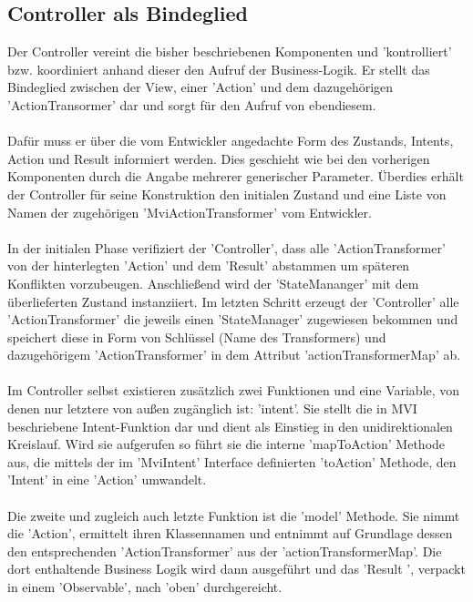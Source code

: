 \subsection{Controller als Bindeglied}
Der Controller vereint die bisher beschriebenen Komponenten und 'kontrolliert' bzw. koordiniert anhand dieser den Aufruf der Business-Logik. Er stellt das Bindeglied zwischen der View, einer 'Action' und dem dazugehörigen 'ActionTransormer' dar und sorgt für den Aufruf von ebendiesem. 
\\\\
Dafür muss er über die vom Entwickler angedachte Form des Zustands, Intents, Action und Result informiert werden. Dies geschieht wie bei den vorherigen Komponenten durch die Angabe mehrerer generischer Parameter. Überdies erhält der Controller für seine Konstruktion den initialen Zustand und eine Liste von Namen der zugehörigen 'MviActionTransformer' vom Entwickler.
\\\\
In der initialen Phase verifiziert der 'Controller', dass alle 'ActionTransformer' von der hinterlegten 'Action' und dem 'Result' abstammen um späteren Konflikten vorzubeugen. Anschließend wird der 'StateMananger' mit dem überlieferten Zustand instanziiert. Im letzten Schritt erzeugt der 'Controller' alle 'ActionTransformer' die jeweils einen 'StateManager' zugewiesen bekommen und speichert diese in Form von Schlüssel (Name des Transformers) und dazugehörigem 'ActionTransformer' in dem Attribut 'actionTransformerMap' ab.
\\\\
Im Controller selbst existieren zusätzlich zwei Funktionen und eine Variable, von denen nur letztere von außen zugänglich ist: 'intent'. Sie stellt die in MVI beschriebene Intent-Funktion dar und dient als Einstieg in den unidirektionalen Kreislauf. Wird sie aufgerufen so führt sie die interne 'mapToAction' Methode aus, die mittels der im 'MviIntent' Interface definierten 'toAction' Methode, den 'Intent' in eine 'Action' umwandelt.
\\\\
Die zweite und zugleich auch letzte Funktion ist die 'model' Methode. Sie nimmt die 'Action', ermittelt ihren Klassennamen und entnimmt auf Grundlage dessen den entsprechenden 'ActionTransformer' aus der 'actionTransformerMap'. Die dort enthaltende Business Logik wird dann ausgeführt und das 'Result ', verpackt in einem 'Observable', nach 'oben' durchgereicht.
